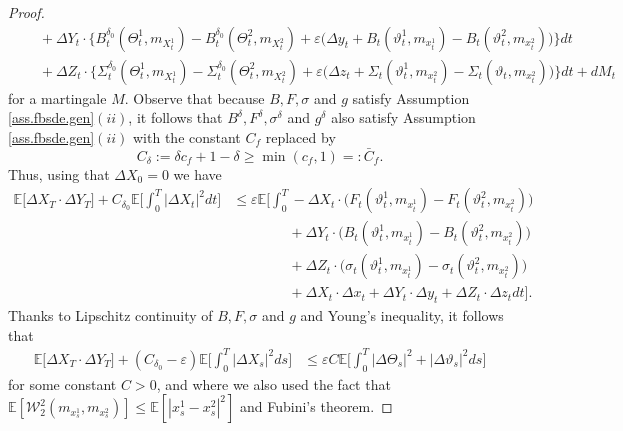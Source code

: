 \documentclass[11pt,reqno]{amsart}
\numberwithin{equation}{section}
\theoremstyle{definition}
\def\E{{\mathbb E}}
\newcommand\cW{\mathcal W}
\def \E{\mathbb{E}}
\begin{document}
\begin{proof}
\begin{align*}
    &\quad + \Delta Y_t\cdot\Big\{ B^{\delta_0}_t(\Theta^1_t, m_{X^1_t}) - B^{\delta_0}_t(\Theta^2_t, m_{X^2_t}) + \varepsilon\big( \Delta y_t + B_t(\vartheta_t^1, m_{x^1_t}) - B_t(\vartheta_t^2, m_{x^2_t}) \big) \Big\}dt\\
    &\quad + \Delta Z_t\cdot\Big\{ \Sigma^{\delta_0}_t(\Theta^1_t, m_{X^1_t}) - \Sigma^{\delta_0}_t(\Theta^2_t, m_{X^2_t}) + \varepsilon\big( \Delta z_t + \Sigma_t(\vartheta_t^1,m_{x^2_t}) - \Sigma_t(\vartheta_t, m_{x^2_t}) \big) \Big\}dt + dM_t
  \end{align*}
  for a martingale $M$.
  Observe that because $B, F, \sigma$ and $g$ satisfy Assumption \ref{ass.fbsde.gen}$(ii)$, it follows that $B^\delta, F^\delta, \sigma^\delta$ and $g^\delta$ also satisfy Assumption \ref{ass.fbsde.gen}$(ii)$ with the constant $C_f$ replaced by
  \begin{equation}
  \label{eq:disp.mon.cons.bound}
    C_{\delta} := \delta c_f + 1 - \delta\ge \min(c_f, 1) =:\bar C_f.
  \end{equation}
  Thus, using that $\Delta X_0 = 0$ we have
  \begin{align*}
    \E\big[\Delta X_T\cdot \Delta Y_T\big] + C_{\delta_0} \E\bigg[\int_0^T|\Delta X_t|^2dt \bigg]&
    \le  \varepsilon \E\bigg[\int_0^T -\Delta X_t \cdot\big(F_t(\vartheta^1_t, m_{x^1_t}) - F_t(\vartheta^2_t, m_{x^2_t}) \big)\\
     &\qquad \qquad + \Delta Y_t\cdot\big( B_t(\vartheta^1_t, m_{x^1_t}) - B_t(\vartheta^2_t, m_{x^2_t}) \big)\\
    &\qquad \qquad  + \Delta Z_t\cdot\big(\sigma_t(\vartheta^1_t, m_{x^1_t}) - \sigma_t(\vartheta^2_t, m_{x^2_t}) \big)\\
    &\qquad \qquad + \Delta X_t\cdot \Delta x_t + \Delta Y_t\cdot \Delta y_t + \Delta Z_t\cdot \Delta z_t dt \bigg].
  \end{align*}
    Thanks to Lipschitz continuity of $B, F, \sigma$ and $g$ and Young's inequality, it follows that
  \begin{align*}
    \E\big[\Delta X_T\cdot \Delta Y_T\big] +(C_{\delta_0}-\varepsilon)\E\bigg[\int_0^T|\Delta X_s|^2ds \bigg] %
    &\le %
     \varepsilon C\E\bigg[\int_0^T|\Delta \Theta_s|^2 + |\Delta \vartheta_s|^2ds\bigg]
  \end{align*}
  for some constant $C>0$, and  where we also used the fact that $\E[\cW^2_2(m_{x^1_s}, m_{x^2_s})]\le \E[|x^1_s - x^2_s|^2]$ and Fubini's theorem.

\end{proof}
\end{document}
